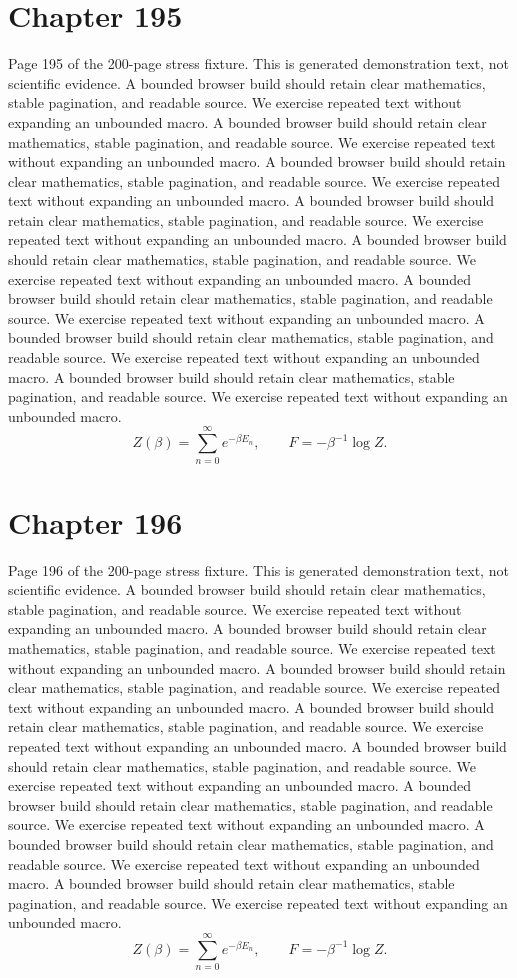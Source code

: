 \documentclass[11pt]{article}
\begin{document}
\section*{Chapter 195}
Page 195 of the 200-page stress fixture. This is generated demonstration text, not scientific evidence.
A bounded browser build should retain clear mathematics, stable pagination, and readable source. We exercise repeated text without expanding an unbounded macro.
A bounded browser build should retain clear mathematics, stable pagination, and readable source. We exercise repeated text without expanding an unbounded macro.
A bounded browser build should retain clear mathematics, stable pagination, and readable source. We exercise repeated text without expanding an unbounded macro.
A bounded browser build should retain clear mathematics, stable pagination, and readable source. We exercise repeated text without expanding an unbounded macro.
A bounded browser build should retain clear mathematics, stable pagination, and readable source. We exercise repeated text without expanding an unbounded macro.
A bounded browser build should retain clear mathematics, stable pagination, and readable source. We exercise repeated text without expanding an unbounded macro.
A bounded browser build should retain clear mathematics, stable pagination, and readable source. We exercise repeated text without expanding an unbounded macro.
A bounded browser build should retain clear mathematics, stable pagination, and readable source. We exercise repeated text without expanding an unbounded macro.
\[Z(\beta)=\sum_{n=0}^{\infty}e^{-\beta E_n},\qquad F=-\beta^{-1}\log Z.\]
\newpage
\section*{Chapter 196}
Page 196 of the 200-page stress fixture. This is generated demonstration text, not scientific evidence.
A bounded browser build should retain clear mathematics, stable pagination, and readable source. We exercise repeated text without expanding an unbounded macro.
A bounded browser build should retain clear mathematics, stable pagination, and readable source. We exercise repeated text without expanding an unbounded macro.
A bounded browser build should retain clear mathematics, stable pagination, and readable source. We exercise repeated text without expanding an unbounded macro.
A bounded browser build should retain clear mathematics, stable pagination, and readable source. We exercise repeated text without expanding an unbounded macro.
A bounded browser build should retain clear mathematics, stable pagination, and readable source. We exercise repeated text without expanding an unbounded macro.
A bounded browser build should retain clear mathematics, stable pagination, and readable source. We exercise repeated text without expanding an unbounded macro.
A bounded browser build should retain clear mathematics, stable pagination, and readable source. We exercise repeated text without expanding an unbounded macro.
A bounded browser build should retain clear mathematics, stable pagination, and readable source. We exercise repeated text without expanding an unbounded macro.
\[Z(\beta)=\sum_{n=0}^{\infty}e^{-\beta E_n},\qquad F=-\beta^{-1}\log Z.\]
\newpage
\end{document}
